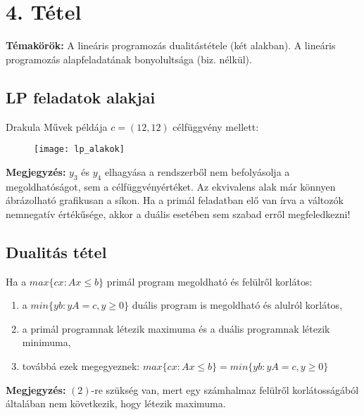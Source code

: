 
\setcounter{chapter}{4}
\chapter*{4. Tétel}

\textbf{Témakörök:} A lineáris programozás dualitástétele (két alakban). A lineáris programozás alapfeladatának bonyolultsága (biz. nélkül).

\noindent\hrulefill

\section*{LP feladatok alakjai}
Drakula Művek példája $c=(12,12)$ célfüggvény mellett:

\begin{figure}[h!]
\texttt{[image: lp\_alakok]}
\centering
\end{figure}

\textbf{Megjegyzés:} $y_{3}$ és $y_{4}$ elhagyása a rendszerből nem befolyásolja a megoldhatóságot, sem a célfüggvényértéket. Az ekvivalens alak már könnyen ábrázolható grafikusan a síkon. Ha a primál feladatban elő van írva a változók nemnegatív értékűsége, akkor a duális esetében sem szabad erről megfeledkezni!

\section*{Dualitás tétel}

\begin{theo} 
Ha a $max \lbrace c x: Ax\leq b\rbrace$ primál program megoldható és felülről korlátos:
\begin{enumerate}
\item	a $min \lbrace yb: yA=c,y\geq 0\rbrace$ duális program is megoldható és alulról korlátos,
\item	a primál programnak létezik maximuma és a duális programnak létezik minimuma,
\item	továbbá ezek megegyeznek: $max\lbrace cx: Ax\leq b\rbrace = min\lbrace yb: yA=c,y\geq 0\rbrace$
\end{enumerate}
\end{theo}
\textbf{Megjegyzés:} $(2)$-re szükség van, mert egy számhalmaz felülről korlátosságából általában nem következik, hogy létezik maximuma.

